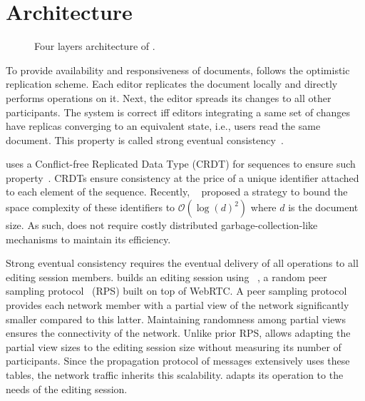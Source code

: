 
\section{Architecture}
\label{sec:architecture}

\begin{figure}
  \centering
  
  \caption{\label{fig:architecture} Four layers architecture of \CRATE.}
\end{figure}

To provide availability and responsiveness of documents, \CRATE follows the
optimistic replication scheme. Each editor replicates the document locally and
directly performs operations on it. Next, the editor spreads its changes to all
other participants. The system is correct iff editors integrating a same set of
changes have replicas converging to an equivalent state, i.e., users read the
same document.  This property is called strong eventual
consistency~\cite{shapiro2011comprehensive}.

\CRATE uses a Conflict-free Replicated Data Type (CRDT) for sequences to ensure
such property~\cite{shapiro2011comprehensive}. CRDTs ensure consistency at the
price of a unique identifier attached to each element of the sequence. Recently,
\LSEQ~\cite{nedelec2013lseq} proposed a strategy to bound the space complexity
of these identifiers to $\mathcal{O}(\log(d)^2)$ where $d$ is the document
size. As such, \CRATE does not require costly distributed
garbage-collection-like mechanisms to maintain its efficiency.

Strong eventual consistency requires the eventual delivery of all operations to
all editing session members.  \CRATE builds an editing session using
\SPRAY~\cite{nedelec2015spray}, a random peer sampling
protocol~\cite{jelasity2007gossip} (RPS) built on top of WebRTC. A peer sampling
protocol provides each network member with a partial view of the network
significantly smaller compared to this latter. Maintaining randomness among
partial views ensures the connectivity of the network. Unlike prior RPS, \SPRAY
allows adapting the partial view sizes to the editing session size without
measuring its number of participants. Since the propagation protocol of messages
extensively uses these tables, the network traffic inherits this scalability.
\CRATE adapts its operation to the needs of the editing session.

